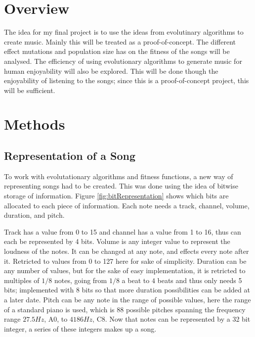 \documentclass{article}
\begin{document}
\section*{Overview}
The idea for my final project is to use the ideas from evolutinary algorithms to create music. Mainly this will be treated as a proof-of-concept. The different effect mutations and population size has on the fitness of the songs will be analysed. The efficiency of using evolutionary algorithms to generate music for human enjoyability will also be explored. This will be done though the enjoyability of listening to the songs; since this is a proof-of-concept project, this will be sufficient. 

\section*{Methods}

\subsection*{Representation of a Song}
  To work with evolutationary algorithms and fitness functions, a new way of representing songs had to be created. This was done using the idea of bitwise storage of information. Figure \ref{fig:bitRepresentation} shows which bits are allocated to each piece of information. Each note needs a track, channel, volume, duration, and pitch. 
  
  Track has a value from 0 to 15 and channel has a value from 1 to 16, thus can each be represented by 4 bits. Volume is any integer value to represent the loudness of the notes. It can be changed at any note, and effects every note after it. Retricted to values from 0 to 127 here for sake of simplicity. Duration can be any number of values, but for the sake of easy implementation, it is retricted to multiples of $1/8$ notes, going from $1/8$ a beat to $4$ beats and thus only needs 5 bits; implemented with 8 bits so that more duration possibilities can be added at a later date. Pitch can be any note in the range of possible values, here the range of a standard piano is used, which is 88 possible pitches spanning the frequency range $27.5 Hz$, A0, to $4186 Hz$, C8. Now that notes can be represented by a 32 bit integer, a series of these integers makes up a song. 
\end{document}
